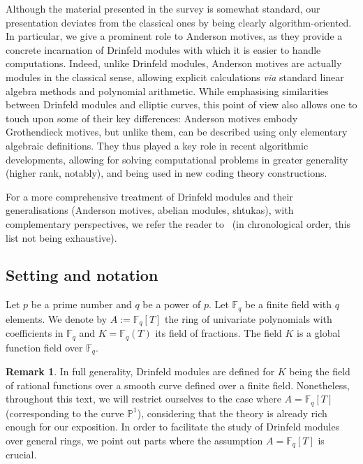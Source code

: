 \documentclass[11pt]{article}
\theoremstyle{definition}
\newtheorem{remark}[theorem]{Remark}
\newcommand\Fq{\mathbb{F}_q}
\begin{document}
Although the material presented in the survey is somewhat standard, our presentation deviates from the classical ones by being clearly algorithm-oriented.
In particular, we give a prominent role to Anderson motives, as they provide a concrete incarnation of Drinfeld modules with which it is easier to handle computations.
Indeed, unlike Drinfeld modules, Anderson motives are actually modules in the
classical sense, allowing explicit calculations \emph{via} standard linear
algebra methods and polynomial arithmetic.
While emphasising similarities between Drinfeld modules and elliptic curves, this point of view also allows one to touch upon some of their key differences:
Anderson motives embody Grothendieck motives, but unlike them, can
be described using only elementary algebraic definitions. They thus played a key
role in recent algorithmic developments, allowing for solving computational
problems in greater generality (higher rank, notably), and being used in new
coding theory constructions.


For a more comprehensive treatment of Drinfeld modules and their
generalisations (Anderson motives, abelian modules, shtukas), with complementary perspectives, we refer the reader
to~\cite{G98,Rosen_2002,Tha04,brownawell_rapid_2020, poonen_introduction_2022, Pap23} (in chronological order, this list not being exhaustive).

\subsection{Setting and notation}
\label{subsection:setting-and-notations}

Let $p$ be a prime number and $q$ be a power of $p$. Let $\Fq$ be a finite field with $q$ elements. We denote by $A:= \Fq[T]$ the ring of univariate polynomials with coefficients in $\Fq$ and $K=\Fq(T)$ its field of fractions. The field $K$ is a global function field over $\Fq$. 

\begin{remark}
In full generality, Drinfeld modules are defined for $K$ being the field of rational functions over a smooth curve defined over a finite field.
Nonetheless, throughout this text, we will restrict ourselves to the case where $A = \Fq[T]$ (corresponding to the curve $\mathbb P^1$), considering that the theory is already rich enough for our exposition. In order to facilitate the study of Drinfeld modules over general rings, we point out parts where the assumption $A=\Fq[T]$ is crucial.
\end{remark}
\end{document}
